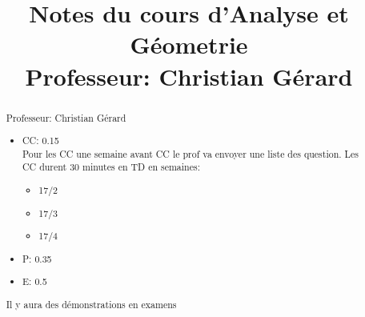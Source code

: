 \documentclass[a4paper]{report}
\title{Notes du cours d'Analyse et Géometrie\\\vspace{1cm}
\Large Professeur: Christian Gérard \normalsize}
\begin{document}
\maketitle
\tableofcontents

\begin{abstract}
Professeur: Christian Gérard
\begin{itemize}
    \item CC: 0.15\\
        Pour les CC une semaine avant CC le prof va envoyer une liste des question. Les CC durent 30 minutes en TD en semaines:
        \begin{itemize}
            \item 17/2
            \item 17/3
            \item 17/4
        \end{itemize}
    \item P: 0.35
    \item E: 0.5
\end{itemize}
Il y aura des démonstrations en examens
\end{abstract}



\end{document}
